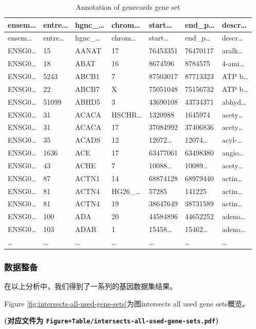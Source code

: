 \documentclass[
]{article}
\begin{document}
\begin{longtable}[]{@{}lllllll@{}}
\caption{\label{tab:annotation-of-genecards-gene-set}Annotation of genecards gene set}\tabularnewline
\toprule
ensem\ldots{} & entre\ldots{} & hgnc\_\ldots{} & chrom\ldots{} & start\ldots{} & end\_p\ldots{} & descr\ldots{}\tabularnewline
\midrule
\endfirsthead
\toprule
ensem\ldots{} & entre\ldots{} & hgnc\_\ldots{} & chrom\ldots{} & start\ldots{} & end\_p\ldots{} & descr\ldots{}\tabularnewline
\midrule
\endhead
ENSG0\ldots{} & 15 & AANAT & 17 & 76453351 & 76470117 & aralk\ldots{}\tabularnewline
ENSG0\ldots{} & 18 & ABAT & 16 & 8674596 & 8784575 & 4-ami\ldots{}\tabularnewline
ENSG0\ldots{} & 5243 & ABCB1 & 7 & 87503017 & 87713323 & ATP b\ldots{}\tabularnewline
ENSG0\ldots{} & 22 & ABCB7 & X & 75051048 & 75156732 & ATP b\ldots{}\tabularnewline
ENSG0\ldots{} & 51099 & ABHD5 & 3 & 43690108 & 43734371 & abhyd\ldots{}\tabularnewline
ENSG0\ldots{} & 31 & ACACA & HSCHR\ldots{} & 1320988 & 1645974 & acety\ldots{}\tabularnewline
ENSG0\ldots{} & 31 & ACACA & 17 & 37084992 & 37406836 & acety\ldots{}\tabularnewline
ENSG0\ldots{} & 35 & ACADS & 12 & 12072\ldots{} & 12074\ldots{} & acyl-\ldots{}\tabularnewline
ENSG0\ldots{} & 1636 & ACE & 17 & 63477061 & 63498380 & angio\ldots{}\tabularnewline
ENSG0\ldots{} & 43 & ACHE & 7 & 10088\ldots{} & 10089\ldots{} & acety\ldots{}\tabularnewline
ENSG0\ldots{} & 87 & ACTN1 & 14 & 68874128 & 68979440 & actin\ldots{}\tabularnewline
ENSG0\ldots{} & 81 & ACTN4 & HG26\_\ldots{} & 57285 & 141225 & actin\ldots{}\tabularnewline
ENSG0\ldots{} & 81 & ACTN4 & 19 & 38647649 & 38731589 & actin\ldots{}\tabularnewline
ENSG0\ldots{} & 100 & ADA & 20 & 44584896 & 44652252 & adeno\ldots{}\tabularnewline
ENSG0\ldots{} & 103 & ADAR & 1 & 15458\ldots{} & 15462\ldots{} & adeno\ldots{}\tabularnewline
\ldots{} & \ldots{} & \ldots{} & \ldots{} & \ldots{} & \ldots{} & \ldots{}\tabularnewline
\bottomrule
\end{longtable}

\hypertarget{ux6570ux636eux6574ux5907}{%
\subsubsection{数据整备}\label{ux6570ux636eux6574ux5907}}

在以上分析中，我们得到了一系列的基因数据集结果。

Figure \ref{fig:intersects-all-used-gene-sets}为图intersects all used gene sets概览。

\textbf{(对应文件为 \texttt{Figure+Table/intersects-all-used-gene-sets.pdf})}
\end{document}
